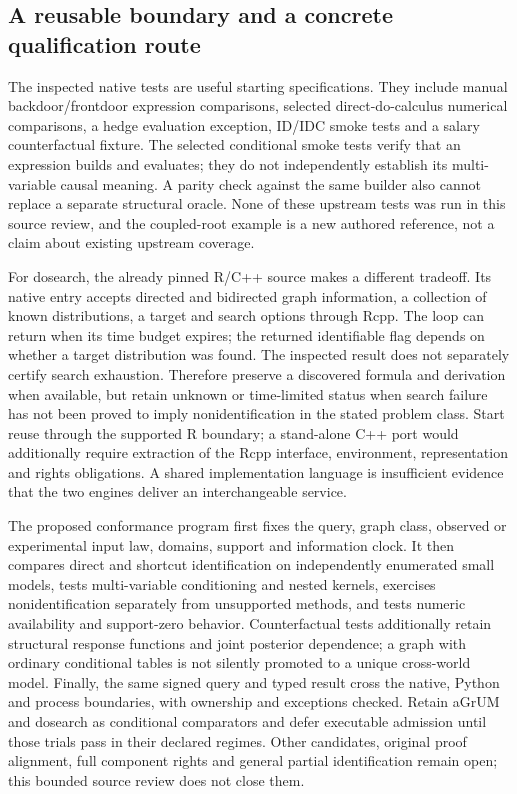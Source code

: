 \subsection{A reusable boundary and a concrete qualification route}
\label{exec19:cxxid-contract}
The inspected native tests are useful starting specifications. They include
manual backdoor/frontdoor expression comparisons, selected direct-do-calculus
numerical comparisons, a hedge evaluation exception, ID/IDC smoke tests and a
salary counterfactual fixture. The selected conditional smoke tests verify that
an expression builds and evaluates; they do not independently establish its
multi-variable causal meaning. A parity check against the same builder also
cannot replace a separate structural oracle. None of these upstream tests was
run in this source review, and the coupled-root example is a new authored
reference, not a claim about existing upstream coverage.
\citep{exec19_cxx_identification_source,exec19_cxx_identification_reference}

For dosearch, the already pinned R/C++ source makes a different tradeoff. Its
native entry accepts directed and bidirected graph information, a collection
of known distributions, a target and search options through Rcpp. The loop can
return when its time budget expires; the returned identifiable flag depends
on whether a target distribution was found. The inspected result does not
separately certify search exhaustion. Therefore preserve a discovered formula
and derivation when available, but retain unknown or time-limited status when
search failure has not been proved to imply nonidentification in the stated
problem class. Start reuse through the supported R boundary; a stand-alone C++
port would additionally require extraction of the Rcpp interface, environment,
representation and rights obligations. A shared implementation language is
insufficient evidence that the two engines deliver an interchangeable service.
\citep{exec18_rid_dosearch}

The proposed conformance program first fixes the query, graph class, observed
or experimental input law, domains, support and information clock. It then
compares direct and shortcut identification on independently enumerated small
models, tests multi-variable conditioning and nested kernels, exercises
nonidentification separately from unsupported methods, and tests numeric
availability and support-zero behavior. Counterfactual tests additionally
retain structural response functions and joint posterior dependence; a graph
with ordinary conditional tables is not silently promoted to a unique
cross-world model. Finally, the same signed query and typed result cross the
native, Python and process boundaries, with ownership and exceptions checked.
Retain aGrUM and dosearch as conditional comparators and defer executable
admission until those trials pass in their declared regimes. Other candidates,
original proof alignment, full component rights and general partial
identification remain open; this bounded source review does not close them.
\citep{exec19_cxx_identification_source,exec18_rid_dosearch,exec19_cxx_identification_reference}


